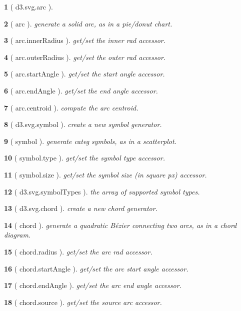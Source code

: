\documentclass[10pt,landscape,letterpaper]{article}
\newcounter{thm}
\theoremstyle{mytheoremstyle}
\newtheorem*{thm}{}
\begin{document}
\begin{multicols}{3}
\begin{thm} [ d3.svg.arc ]
\end{thm}\begin{thm} [ arc ]  generate a solid arc, as in a pie/donut chart.
\end{thm}\begin{thm} [ arc.innerRadius ]  get/set the inner rad accessor.
\end{thm}\begin{thm} [ arc.outerRadius ]  get/set the outer rad accessor.
\end{thm}\begin{thm} [ arc.startAngle ]  get/set the start angle accessor.
\end{thm}\begin{thm} [ arc.endAngle ]  get/set the end angle accessor.
\end{thm}\begin{thm} [ arc.centroid ]  compute the arc centroid.
\end{thm}\begin{thm} [ d3.svg.symbol ]  create a new symbol generator.
\end{thm}\begin{thm} [ symbol ]  generate categ symbols, as in a scatterplot.
\end{thm}\begin{thm} [ symbol.type ]  get/set the symbol type accessor.
\end{thm}\begin{thm} [ symbol.size ]  get/set the symbol size (in square px) accessor.
\end{thm}\begin{thm} [ d3.svg.symbolTypes ]  the array of supported symbol types.
\end{thm}\begin{thm} [ d3.svg.chord ]  create a new chord generator.
\end{thm}\begin{thm} [ chord ]  generate a quadratic Bézier connecting two arcs, as in a chord diagram.
\end{thm}\begin{thm} [ chord.radius ]  get/set the arc rad accessor.
\end{thm}\begin{thm} [ chord.startAngle ]  get/set the arc start angle accessor.
\end{thm}\begin{thm} [ chord.endAngle ]  get/set the arc end angle accessor.
\end{thm}\begin{thm} [ chord.source ]  get/set the source arc accessor.

\end{thm}
\end{multicols}
\end{document}

